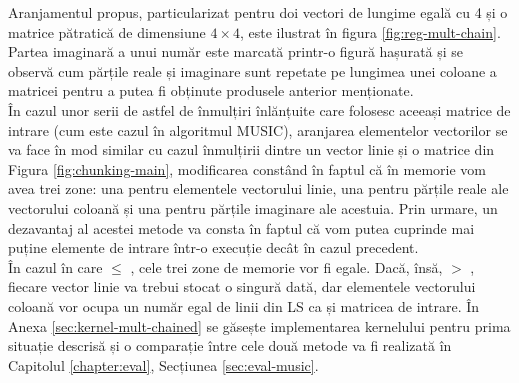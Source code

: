 Aranjamentul propus, particularizat pentru doi vectori de lungime egală cu 4 și
o matrice pătratică de dimensiune $4 \times 4$, este ilustrat în figura
\ref{fig:reg-mult-chain}. Partea imaginară a unui număr este marcată printr-o
figură hașurată și se observă cum părțile reale și imaginare sunt
repetate pe lungimea unei coloane a matricei pentru a putea fi obținute
produsele anterior menționate. \\

În cazul unor serii de astfel de înmulțiri înlănțuite care folosesc aceeași
matrice de intrare (cum este cazul în algoritmul MUSIC), aranjarea elementelor
vectorilor se va face în mod similar cu cazul înmulțirii dintre un vector linie
și o matrice din Figura \ref{fig:chunking-main}, modificarea constând în faptul că
în memorie vom avea trei zone: una pentru elementele
vectorului linie, una pentru părțile reale ale vectorului coloană și una pentru
părțile imaginare ale acestuia. Prin urmare, un dezavantaj al acestei metode va
consta în faptul că vom putea cuprinde mai puține elemente de intrare
într-o execuție decât în cazul precedent. \\ 

În cazul în care  $\le$ , cele trei
zone de memorie vor fi egale. Dacă, însă,  $>$
, fiecare vector linie va trebui stocat o singură
dată, dar elementele vectorului coloană vor ocupa un număr egal de linii din LS
ca și matricea de intrare. În Anexa \ref{sec:kernel-mult-chained} se găsește
implementarea kernelului pentru prima situație descrisă și o comparație între
cele două metode va fi realizată în Capitolul \ref{chapter:eval}, Secțiunea
\ref{sec:eval-music}.


% 


